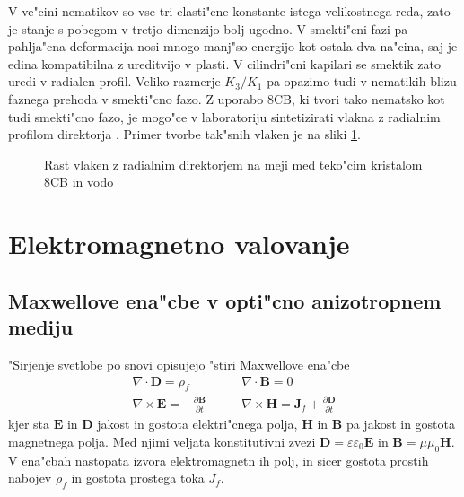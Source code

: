 \documentclass[12pt,twoside,openright,final]{report}
\newcommand{\odvod}[2]{\frac{\partial #1}{\partial #2}}
\renewcommand{\vec}{\mathbf}
\begin{document}
V ve"cini nematikov so vse tri elasti"cne konstante istega velikostnega reda, zato je stanje s pobegom v tretjo dimenzijo bolj ugodno. 
V smekti"cni fazi pa pahlja"cna deformacija nosi mnogo manj"so energijo kot ostala dva na"cina, saj je edina kompatibilna z ureditvijo v plasti. 
V cilindri"cni kapilari se smektik zato uredi v radialen profil. 
Veliko razmerje $K_3/K_1$ pa opazimo tudi v nematikih blizu faznega prehoda v smekti"cno fazo. 
Z uporabo 8CB, ki tvori tako nematsko kot tudi smekti"cno fazo, je mogo"ce v laboratoriju sintetizirati vlakna z radialnim profilom direktorja \cite{peddireddy}. 
Primer tvorbe tak"snih vlaken je na sliki \ref{fig:tvorjenje}. 

\begin{figure}[h]
 \centering
 \caption{Rast vlaken z radialnim direktorjem na meji med teko"cim kristalom 8CB in vodo \cite{peddireddy}}
 \label{fig:tvorjenje}
\end{figure}

\chapter{Elektromagnetno valovanje}

\section{Maxwellove ena"cbe v opti"cno anizotropnem mediju}
"Sirjenje svetlobe po snovi opisujejo "stiri Maxwellove ena"cbe \cite{taflove}
\begin{equation}
\begin{aligned}
 \nabla \cdot \vec D = \rho_f & \qquad \nabla \cdot \vec B = 0 \\
 \nabla \times \vec E = -\odvod{\vec B}{t} & \qquad \nabla \times \vec H = \vec J_f + \odvod{\vec D}{t}
\end{aligned} 
\end{equation}
kjer sta $\vec E$ in $\vec D$ jakost in gostota elektri"cnega polja, $\vec H$ in $\vec B$ pa jakost in gostota magnetnega polja. 
Med njimi veljata konstitutivni zvezi $\vec D = \varepsilon \varepsilon_0 \vec E$ in $\vec B = \mu \mu_0 \vec H$. 
V ena"cbah nastopata izvora elektromagnetn	ih polj, in sicer gostota prostih nabojev $\rho_f$ in gostota prostega toka $J_f$. 
\end{document}
